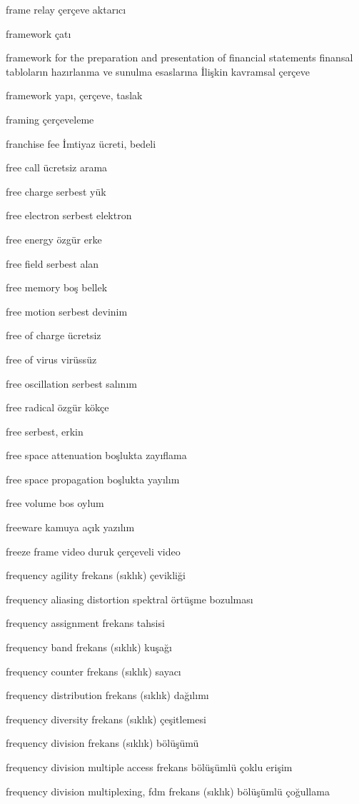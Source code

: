 \documentclass[12pt,fleqn]{article}\usepackage{../../common}
\begin{document}
frame relay çerçeve aktarıcı

framework çatı

framework for the preparation and presentation of financial statements finansal tabloların hazırlanma ve sunulma esaslarına İlişkin kavramsal çerçeve

framework yapı, çerçeve, taslak

framing çerçeveleme

franchise fee İmtiyaz ücreti, bedeli

free call ücretsiz arama

free charge serbest yük

free electron serbest elektron

free energy özgür erke

free field serbest alan

free memory boş bellek

free motion serbest devinim

free of charge ücretsiz

free of virus virüssüz

free oscillation serbest salınım

free radical özgür kökçe

free serbest, erkin

free space attenuation boşlukta zayıflama

free space propagation boşlukta yayılım

free volume bos oylum

freeware kamuya açık yazılım

freeze frame video duruk çerçeveli video

frequency agility frekans (sıklık) çevikliği

frequency aliasing distortion spektral örtüşme bozulması

frequency assignment frekans tahsisi

frequency band frekans (sıklık) kuşağı

frequency counter frekans (sıklık) sayacı

frequency distribution frekans (sıklık) dağılımı

frequency diversity frekans (sıklık) çeşitlemesi

frequency division frekans (sıklık) bölüşümü

frequency division multiple access frekans bölüşümlü çoklu erişim

frequency division multiplexing, fdm frekans (sıklık) bölüşümlü çoğullama
\end{document}
